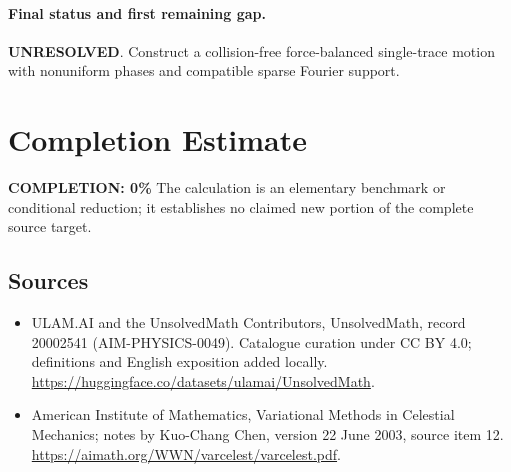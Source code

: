 \documentclass[11pt]{article}
\begin{document}
\paragraph{Final status and first remaining gap.}
\textbf{UNRESOLVED}. Construct a collision-free force-balanced single-trace motion with nonuniform phases and compatible sparse Fourier support.

\section{Completion Estimate}
\noindent\textbf{COMPLETION: 0\%}
The calculation is an elementary benchmark or conditional reduction; it establishes no claimed new portion of the complete source target.

\subsection{Sources}
\begin{itemize}
\item[\hypertarget{source:20002541:1}{S1}] ULAM.AI and the UnsolvedMath Contributors, UnsolvedMath, record 20002541 (AIM-PHYSICS-0049). Catalogue curation under CC BY 4.0; definitions and English exposition added locally.
\url{https://huggingface.co/datasets/ulamai/UnsolvedMath}.
\item[\hypertarget{source:20002541:2}{S2}] American Institute of Mathematics, Variational Methods in Celestial Mechanics; notes by Kuo-Chang Chen, version 22 June 2003, source item 12.
\url{https://aimath.org/WWN/varcelest/varcelest.pdf}.
\end{itemize}
\label{end:20002541}
\end{document}

